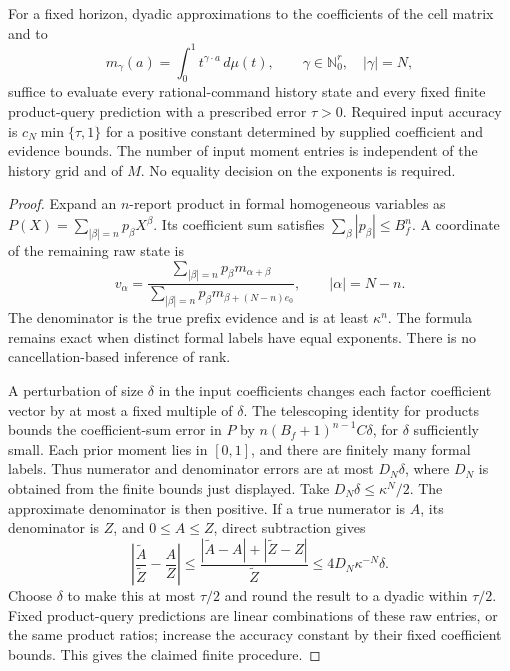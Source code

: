 \begin{lemma}
\label{lem:finite-moments}
For a fixed horizon, dyadic approximations to the coefficients of the
cell matrix and to
\begin{equation}\label{eq:finite-prior-table}
 m_\gamma(a)=\int_0^1t^{\gamma\cdot a}\,d\mu(t),\qquad
 \gamma\in\mathbb N_0^r,\quad |\gamma|=N,
\end{equation}
suffice to evaluate every rational-command history state and every fixed
finite product-query prediction with a prescribed error $\tau>0$.
Required input accuracy is $c_N\min\{\tau,1\}$ for a positive
constant determined by supplied coefficient and evidence bounds. The
number of input moment entries is independent of the history grid and
of $M$. No equality decision on the exponents is required.
\end{lemma}
\begin{proof}
Expand an $n$-report product in formal homogeneous variables as
$P(X)=\sum_{|\beta|=n}p_\beta X^\beta$. Its coefficient sum satisfies
$\sum_\beta|p_\beta|\le B_f^n$. A coordinate of the remaining raw
state is
\begin{equation}\label{eq:finite-evaluation}
 v_\alpha=
 \frac{\sum_{|\beta|=n}p_\beta m_{\alpha+\beta}}
      {\sum_{|\beta|=n}p_\beta m_{\beta+(N-n)e_0}},
 \qquad |\alpha|=N-n.
\end{equation}
The denominator is the true prefix evidence and is at least $\kappa^n$.
The formula remains exact when distinct formal labels have equal
exponents. There is no cancellation-based inference of rank.

A perturbation of size $\delta$ in the input coefficients changes each
factor coefficient vector by at most a fixed multiple of $\delta$.
The telescoping identity for products bounds the coefficient-sum error
in $P$ by $n(B_f+1)^{n-1}C\delta$, for $\delta$ sufficiently small.
Each prior moment lies in $[0,1]$, and there are finitely many formal
labels. Thus numerator and denominator errors are at most $D_N\delta$,
where $D_N$ is obtained from the finite bounds just displayed.
Take $D_N\delta\le\kappa^N/2$. The approximate denominator is then
positive. If a true numerator is $A$, its denominator is $Z$, and
$0\le A\le Z$, direct subtraction gives
\[
 \left|\frac{\widetilde A}{\widetilde Z}-\frac AZ\right|
 \le\frac{|\widetilde A-A|+|\widetilde Z-Z|}{\widetilde Z}
 \le4D_N\kappa^{-N}\delta.
\]
Choose $\delta$ to make this at most $\tau/2$ and round the result
to a dyadic within $\tau/2$. Fixed product-query predictions are
linear combinations of these raw entries, or the same product ratios;
increase the accuracy constant by their fixed coefficient bounds.
This gives the claimed finite procedure.
\end{proof}

